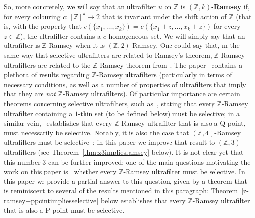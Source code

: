 \documentclass{amsart}
\theoremstyle{definition}
\theoremstyle{remark}
\numberwithin{equation}{section}
\begin{document}
So, more concretely, we will say that an ultrafilter $u$ on $\mathbb Z$ is {\bf $(\mathbb Z,k)$-Ramsey} if, for every colouring $c:[\mathbb Z]^k\longrightarrow 2$ that is invariant under the shift action of $\mathbb Z$ (that is, with the property that $c(\{x_1,\ldots,x_k\})=c(\{x_1+z,\ldots,x_k+z\})$ for every $z\in\mathbb Z$), the ultrafilter contains a $c$-homogeneous set. We will simply say that an ultrafilter is $\mathbb Z$-Ramsey when it is $(\mathbb Z,2)$-Ramsey. One could say that, in the same way that selective ultrafilters are related to Ramsey's theorem, $\mathbb Z$-Ramsey ultrafilters are related to the $\mathbb Z$-Ramsey theorem from~\cite{fb-afml}. The paper~\cite{MR3681104} contains a plethora of results regarding $\mathbb Z$-Ramsey ultrafilters (particularly in terms of necessary conditions, as well as a number of properties of ultrafilters that imply that they are {\it not} $\mathbb Z$-Ramsey ultrafilters). Of particular importance are certain theorems concerning selective ultrafilters, such as~\cite[Theorem 2.6]{MR3376354}, stating that every $\mathbb Z$-Ramsey ultrafilter containing a $1$-thin set (to be defined below) must be selective; in a similar vein,~\cite[Corollary 2.7]{MR3681104} establishes that every $\mathbb Z$-Ramsey ultrafilter that is also a Q-point, must necessarily be selective. Notably, it is also the case that $(\mathbb Z,4)$-Ramsey ultrafilters must be selective~\cite[Corollary 2.8]{MR3681104}; in this paper we improve that result to $(\mathbb Z,3)$-ultrafilters (see Theorem~\ref{thm:z3impliesramsey} below). It is not clear yet that this number 3 can be further improved: one of the main questions motivating the work on this paper is~\cite[Question 5.1]{MR3376354} whether every $\mathbb{Z}$-Ramsey ultrafilter must be selective. In this paper we provide a partial answer to this question, given by a theorem that is reminiscent to several of the results mentioned in this paragraph: Theorem~\ref{z-ramsey+ppointimpliesselective} below establishes that every $\mathbb Z$-Ramsey ultrafilter that is also a P-point must be selective.
\end{document}
